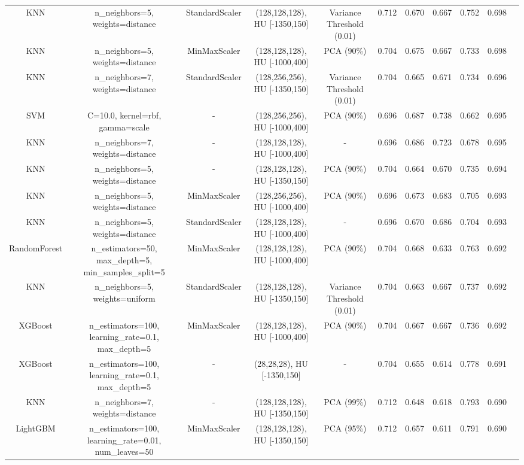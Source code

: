\begin{sidewaystable}[!htbp]
{\begin{tabular}{ccccccccccc}
KNN & n\_neighbors=5, weights=distance & StandardScaler & (128,128,128), HU [-1350,150] & Variance Threshold (0.01) & 0.712 & 0.670 & 0.667 & 0.752 & 0.698 \\
KNN & n\_neighbors=5, weights=distance & MinMaxScaler & (128,128,128), HU [-1000,400] & PCA (90\%) & 0.704 & 0.675 & 0.667 & 0.733 & 0.698 \\
KNN & n\_neighbors=7, weights=distance & StandardScaler & (128,256,256), HU [-1350,150] & Variance Threshold (0.01) & 0.704 & 0.665 & 0.671 & 0.734 & 0.696 \\
SVM & C=10.0, kernel=rbf, gamma=scale & - & (128,256,256), HU [-1000,400] & PCA (90\%) & 0.696 & 0.687 & 0.738 & 0.662 & 0.695 \\
KNN & n\_neighbors=7, weights=distance & - & (128,128,128), HU [-1000,400] & - & 0.696 & 0.686 & 0.723 & 0.678 & 0.695 \\
KNN & n\_neighbors=5, weights=distance & - & (128,128,128), HU [-1350,150] & PCA (90\%) & 0.704 & 0.664 & 0.670 & 0.735 & 0.694 \\
KNN & n\_neighbors=5, weights=distance & MinMaxScaler & (128,256,256), HU [-1000,400] & PCA (90\%) & 0.696 & 0.673 & 0.683 & 0.705 & 0.693 \\
KNN & n\_neighbors=5, weights=distance & StandardScaler & (128,128,128), HU [-1000,400] & - & 0.696 & 0.670 & 0.686 & 0.704 & 0.693 \\
RandomForest & n\_estimators=50, max\_depth=5, min\_samples\_split=5 & MinMaxScaler & (128,128,128), HU [-1000,400] & PCA (90\%) & 0.704 & 0.668 & 0.633 & 0.763 & 0.692 \\
KNN & n\_neighbors=5, weights=uniform & StandardScaler & (128,128,128), HU [-1350,150] & Variance Threshold (0.01) & 0.704 & 0.663 & 0.667 & 0.737 & 0.692 \\
XGBoost & n\_estimators=100, learning\_rate=0.1, max\_depth=5 & MinMaxScaler & (128,128,128), HU [-1000,400] & PCA (90\%) & 0.704 & 0.667 & 0.667 & 0.736 & 0.692 \\
XGBoost & n\_estimators=100, learning\_rate=0.1, max\_depth=5 & - & (28,28,28), HU [-1350,150] & - & 0.704 & 0.655 & 0.614 & 0.778 & 0.691 \\
KNN & n\_neighbors=7, weights=distance & - & (128,128,128), HU [-1350,150] & PCA (99\%) & 0.712 & 0.648 & 0.618 & 0.793 & 0.690 \\
LightGBM & n\_estimators=100, learning\_rate=0.01, num\_leaves=50 & MinMaxScaler & (128,128,128), HU [-1350,150] & PCA (95\%) & 0.712 & 0.657 & 0.611 & 0.791 & 0.690 \\

\bottomrule
\end{tabular}%
}
\end{sidewaystable}


